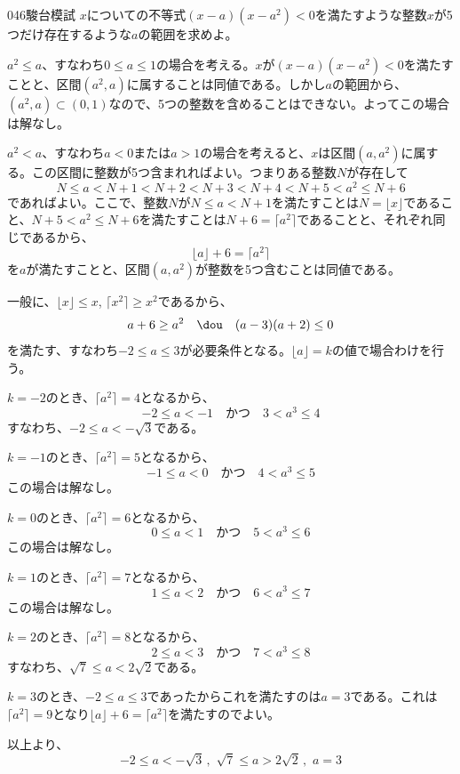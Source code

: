 \begin{prob}{046}{\maru}{駿台模試}
 $x$についての不等式$(x-a)(x-a^2)<0$を満たすような整数$x$が5つだけ存在するような$a$の範囲を求めよ。
\end{prob}
$a^2\le a$、すなわち$0\le a\le 1$の場合を考える。$x$が$(x-a)(x-a^2)<0$を満たすことと、区間$(a^2, a)$に属することは同値である。しかし$a$の範囲から、$(a^2, a)\subset (0, 1)$なので、5つの整数を含めることはできない。よってこの場合は解なし。

$a^2<a$、すなわち$a<0$または$a>1$の場合を考えると、$x$は区間$(a, a^2)$に属する。この区間に整数が5つ含まれればよい。つまりある整数$N$が存在して
\[ N\le a<N+1<N+2<N+3<N+4<N+5<a^2\le N+6 \]
であればよい。ここで、整数$N$が$N\le a<N+1$を満たすことは$N=\lfloor x\rfloor$であること、$N+5<a^2\le N+6$を満たすことは$N+6=\lceil a^2\rceil$であることと、それぞれ同じであるから、
\[ \lfloor a\rfloor + 6=\lceil a^2\rceil \]
を$a$が満たすことと、区間$(a, a^2)$が整数を5つ含むことは同値である。

一般に、$\lfloor x\rfloor \le x$, $\lceil x^2\rceil \ge x^2$であるから、
\[ a+6\ge a^2 \quad\dou\quad (a-3)(a+2)\le 0 \]
を満たす、すなわち$-2\le a\le 3$が必要条件となる。$\lfloor a\rfloor=k$の値で場合わけを行う。

$k=-2$のとき、$\lceil a^2\rceil=4$となるから、
\[ -2\le a< -1 \quad\text{かつ}\quad 3<a^3\le 4 \]
すなわち、$-2\le a <-\sqrt{3}$である。

$k=-1$のとき、$\lceil a^2\rceil=5$となるから、
\[ -1\le a< 0 \quad\text{かつ}\quad 4<a^3\le 5 \]
この場合は解なし。

$k=0$のとき、$\lceil a^2\rceil=6$となるから、
\[ 0\le a< 1 \quad\text{かつ}\quad 5<a^3\le 6 \]
この場合は解なし。

$k=1$のとき、$\lceil a^2\rceil=7$となるから、
\[ 1\le a< 2 \quad\text{かつ}\quad 6<a^3\le 7 \]
この場合は解なし。

$k=2$のとき、$\lceil a^2\rceil=8$となるから、
\[ 2\le a< 3 \quad\text{かつ}\quad 7<a^3\le 8 \]
すなわち、$\sqrt{7}\le a <2\sqrt{2}$である。

$k=3$のとき、$-2\le a\le 3$であったからこれを満たすのは$a=3$である。これは$\lceil a^2\rceil=9$となり$\lfloor a\rfloor + 6=\lceil a^2\rceil$を満たすのでよい。

以上より、
\[ -2\le a<-\sqrt{3} \,,\,\, \sqrt{7}\le a>2\sqrt{2} \,,\,\, a=3 \]

